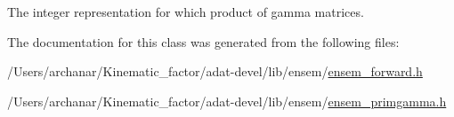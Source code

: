 The integer representation for which product of gamma matrices. 



The documentation for this class was generated from the following files\+:\begin{DoxyCompactItemize}
\item 
/\+Users/archanar/\+Kinematic\+\_\+factor/adat-\/devel/lib/ensem/\mbox{\hyperlink{adat-devel_2lib_2ensem_2ensem__forward_8h}{ensem\+\_\+forward.\+h}}\item 
/\+Users/archanar/\+Kinematic\+\_\+factor/adat-\/devel/lib/ensem/\mbox{\hyperlink{adat-devel_2lib_2ensem_2ensem__primgamma_8h}{ensem\+\_\+primgamma.\+h}}\end{DoxyCompactItemize}
